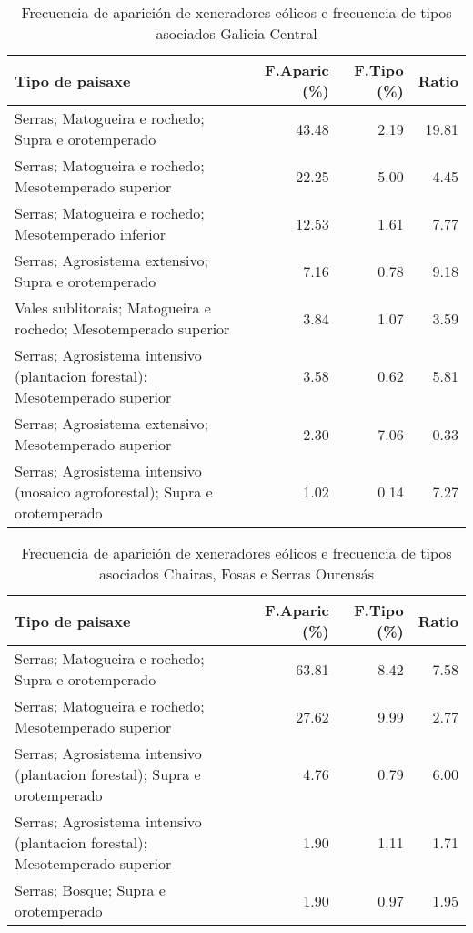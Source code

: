 \begin{table}[p]
\centering
\caption{Frecuencia de aparición de xeneradores eólicos e frecuencia de tipos asociados Galicia Central} 
\label{veolico7}
\begin{tabular}{lrrr}
  \hline
Tipo de paisaxe & F.Aparic (\%) & F.Tipo (\%) & Ratio \\ 
  \hline
Serras; Matogueira e rochedo; Supra e orotemperado & 43.48 & 2.19 & 19.81 \\ 
  Serras; Matogueira e rochedo; Mesotemperado superior & 22.25 & 5.00 & 4.45 \\ 
  Serras; Matogueira e rochedo; Mesotemperado inferior & 12.53 & 1.61 & 7.77 \\ 
  Serras; Agrosistema extensivo; Supra e orotemperado & 7.16 & 0.78 & 9.18 \\ 
  Vales sublitorais; Matogueira e rochedo; Mesotemperado superior & 3.84 & 1.07 & 3.59 \\ 
  Serras; Agrosistema intensivo (plantacion forestal); Mesotemperado superior & 3.58 & 0.62 & 5.81 \\ 
  Serras; Agrosistema extensivo; Mesotemperado superior & 2.30 & 7.06 & 0.33 \\ 
  Serras; Agrosistema intensivo (mosaico agroforestal); Supra e orotemperado & 1.02 & 0.14 & 7.27 \\ 
   \hline
\end{tabular}
\end{table}
\begin{table}[p]
\centering
\caption{Frecuencia de aparición de xeneradores eólicos e frecuencia de tipos asociados Chairas, Fosas e Serras Ourensás} 
\label{veolico8}
\begin{tabular}{lrrr}
  \hline
Tipo de paisaxe & F.Aparic (\%) & F.Tipo (\%) & Ratio \\ 
  \hline
Serras; Matogueira e rochedo; Supra e orotemperado & 63.81 & 8.42 & 7.58 \\ 
  Serras; Matogueira e rochedo; Mesotemperado superior & 27.62 & 9.99 & 2.77 \\ 
  Serras; Agrosistema intensivo (plantacion forestal); Supra e orotemperado & 4.76 & 0.79 & 6.00 \\ 
  Serras; Agrosistema intensivo (plantacion forestal); Mesotemperado superior & 1.90 & 1.11 & 1.71 \\ 
  Serras; Bosque; Supra e orotemperado & 1.90 & 0.97 & 1.95 \\ 
   \hline
\end{tabular}
\end{table}
